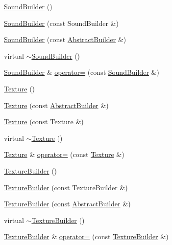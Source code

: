 \begin{DoxyCompactItemize}
\item 
\hyperlink{namespacejli_a8f4ec8e64074533a36d1da7cbb34cae1}{Sound\+Builder} ()
\item 
\hyperlink{namespacejli_a7e154f53d97abf9172ea552b57209ba2}{Sound\+Builder} (const Sound\+Builder \&)
\item 
\hyperlink{namespacejli_a8c348a752b55a388831e7ebcb7243a4c}{Sound\+Builder} (const \hyperlink{classjli_1_1_abstract_builder}{Abstract\+Builder} \&)
\item 
virtual \hyperlink{namespacejli_aeb7223070a119168071589071c350f6c}{$\sim$\+Sound\+Builder} ()
\item 
\hyperlink{namespacejli_a8f4ec8e64074533a36d1da7cbb34cae1}{Sound\+Builder} \& \hyperlink{namespacejli_a4642ebecf1bc8e3cbbca8668ce172e0c}{operator=} (const \hyperlink{namespacejli_a8f4ec8e64074533a36d1da7cbb34cae1}{Sound\+Builder} \&)
\item 
\hyperlink{namespacejli_af439880a37381b944f022b137ba60090}{Texture} ()
\item 
\hyperlink{namespacejli_adf2c12e5f65a2d23492face6497e8235}{Texture} (const \hyperlink{classjli_1_1_abstract_builder}{Abstract\+Builder} \&)
\item 
\hyperlink{namespacejli_a462331f43eddfc32abbc9c9863d13153}{Texture} (const Texture \&)
\item 
virtual \hyperlink{namespacejli_a8b40adac0117494874828b61e808bf52}{$\sim$\+Texture} ()
\item 
\hyperlink{namespacejli_af439880a37381b944f022b137ba60090}{Texture} \& \hyperlink{namespacejli_a833cb9a4318c25680adcbaca8367e96f}{operator=} (const \hyperlink{namespacejli_af439880a37381b944f022b137ba60090}{Texture} \&)
\item 
\hyperlink{namespacejli_a230c95f463f356da9b09f9d5c01a886a}{Texture\+Builder} ()
\item 
\hyperlink{namespacejli_a0c4653b87b22d6e74ffe6121e28fd31b}{Texture\+Builder} (const Texture\+Builder \&)
\item 
\hyperlink{namespacejli_abd8c35fc3a2907805338a117b15c0b36}{Texture\+Builder} (const \hyperlink{classjli_1_1_abstract_builder}{Abstract\+Builder} \&)
\item 
virtual \hyperlink{namespacejli_a14d66bbbc1cec1be6fc3808a185f17de}{$\sim$\+Texture\+Builder} ()
\item 
\hyperlink{namespacejli_a230c95f463f356da9b09f9d5c01a886a}{Texture\+Builder} \& \hyperlink{namespacejli_af2a4079c16f2a4cb961a477ea58ffe55}{operator=} (const \hyperlink{namespacejli_a230c95f463f356da9b09f9d5c01a886a}{Texture\+Builder} \&)

\end{DoxyCompactItemize}
